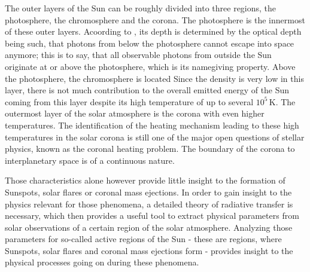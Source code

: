 \documentclass[a4paper,12pt]{report}
\begin{document}

The outer layers of the Sun can be roughly divided into three regions, the photosphere, the chromosphere and the corona. The photosphere is the innermost of these outer layers. Acoording to \cite[p.135]{Weigert.2006}, its depth is determined by the optical depth being such, that photons from below the photosphere cannot escape into space anymore; this is to say, that all observable photons from outside the Sun originate at or above the photosphere, which is its namegiving property. Above the photosphere, the chromosphere is located Since the density is very low in this layer, there is not much contribution to the overall emitted energy of the Sun coming from this layer despite its high temperature of up to several $10^5\,\si{\kelvin}$. The outermost layer of the solar atmosphere is the corona with even higher temperatures. The identification of the heating mechanism leading to these high temperatures in the solar corona is still one of the major open questions of stellar physics, known as the coronal heating problem. The boundary of the corona to interplanetary space is of a continuous nature.

Those characteristics alone however provide little insight to the formation of Sunspots, solar flares or coronal mass ejections. In order to gain insight to the physics relevant for those phenomena, a detailed theory of radiative transfer is necessary, which then provides a useful tool to extract physical parameters from solar observations of a certain region of the solar atmosphere. Analyzing those parameters for so-called active regions of the Sun - these are regions, where Sunspots, solar flares and coronal mass ejections form - provides insight to the physical processes going on during these phenomena.
\end{document}
